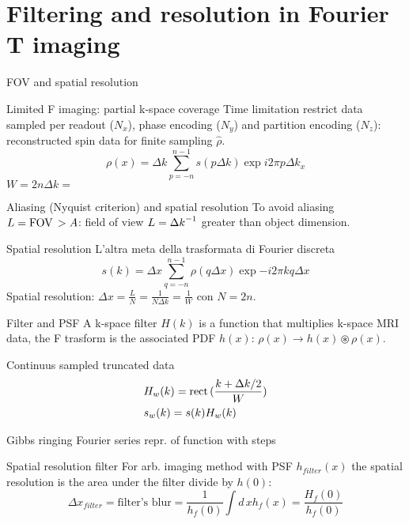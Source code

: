 \section{Filtering and resolution in Fourier T imaging}

\begin{frame}{FOV and spatial resolution}
    \begin{block}{Limited F imaging: partial k-space coverage}
    Time limitation restrict data sampled per readout ($N_x$), phase encoding ($N_y$) and partition encoding ($N_z$): reconstructed spin data for finite sampling $\hat{\rho}$.
    \begin{equation*}
        \rho(x)=\Delta k\sum_{p=-n}^{n-1}s(p\Delta k)\exp{i2\pi p\Delta k_x}
    \end{equation*}
    $W=2n\Delta k=$
    \end{block}
    \begin{block}{Aliasing (Nyquist criterion) and spatial resolution}
    To avoid aliasing $L=\operatorname{FOV}{}>A$: field of view $L={\Delta k}^{-1}$ greater than object dimension.
    \end{block}
\begin{block}{Spatial resolution}
L'altra meta della trasformata di Fourier discreta
\begin{equation*}
s(k)=\Delta x\sum_{q=-n}^{n-1}\rho(q\Delta x)\exp{-i2\pi kq\Delta x}
\end{equation*}
Spatial resolution: $\Delta x=\frac{L}{N}=\frac{1}{N\Delta k}=\frac{1}{W}$ con $N=2n$.
\end{block}
\end{frame}

\begin{frame}{Filter and PSF}
A k-space filter $H(k)$ is a function that multiplies k-space MRI data, the F trasform is the associated PDF $h(x)$: $\rho(x)\to h(x)\circledast \rho(x)$.
\begin{block}{Continuus sampled truncated data}
\begin{align*}
&H_w(k)=\operatorname{rect}{(\frac{k+\Delta k/2}{W})}\\
&s_w(k)=s(k)H_w(k)
\end{align*}
\end{block}
\begin{block}{Gibbs ringing}
Fourier series repr. of function with steps
\end{block}
\begin{block}{Spatial resolution filter}
For arb. imaging method with PSF $h_{filter}(x)$ the spatial resolution is the area under the filter divide by $h(0)$:
\begin{equation*}
\Delta x_{filter}=\text{filter's blur}=\frac{1}{h_f(0)}\int d\,xh_f(x)=\frac{H_f(0)}{h_f(0)}
\end{equation*}
\end{block}
\end{frame}

